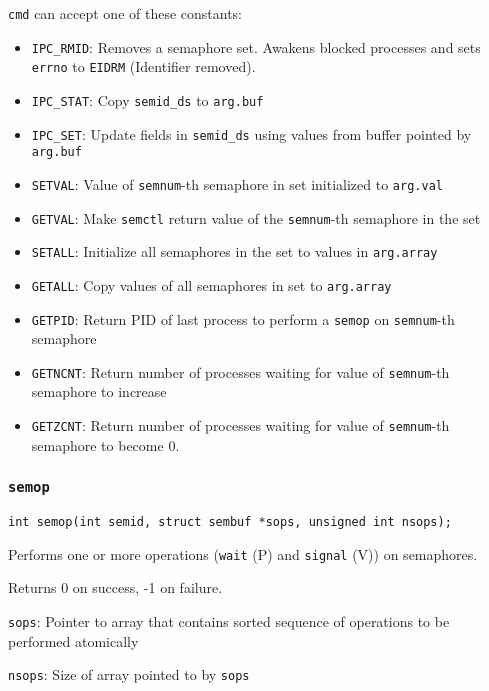 \documentclass{article}
\begin{document}
\texttt{cmd} can accept one of these constants:

\begin{itemize}
    \item \texttt{IPC\_RMID}: Removes a semaphore set. Awakens blocked processes and sets \texttt{errno} to \texttt{EIDRM} (Identifier removed).
    \item \texttt{IPC\_STAT}: Copy \texttt{semid\_ds} to \texttt{arg.buf}
    \item \texttt{IPC\_SET}: Update fields in \texttt{semid\_ds} using values from buffer pointed by \texttt{arg.buf}
    \item \texttt{SETVAL}: Value of \texttt{semnum}-th semaphore in set initialized to \texttt{arg.val}
    \item \texttt{GETVAL}: Make \texttt{semctl} return value of the \texttt{semnum}-th semaphore in the set
    \item \texttt{SETALL}: Initialize all semaphores in the set to values in \texttt{arg.array}
    \item \texttt{GETALL}: Copy values of all semaphores in set to \texttt{arg.array}
    \item \texttt{GETPID}: Return PID of last process to perform a \texttt{semop} on \texttt{semnum}-th semaphore
    \item \texttt{GETNCNT}: Return number of processes waiting for value of \texttt{semnum}-th semaphore to increase
    \item \texttt{GETZCNT}: Return number of processes waiting for value of \texttt{semnum}-th semaphore to become 0.
\end{itemize}


\subsubsection{\texttt{semop}}

\begin{verbatim}
int semop(int semid, struct sembuf *sops, unsigned int nsops);
\end{verbatim}

Performs one or more operations (\texttt{wait} (P) and \texttt{signal} (V)) on semaphores.

Returns 0 on success, -1 on failure.

\texttt{sops}: Pointer to array that contains sorted sequence of operations to be performed atomically

\texttt{nsops}: Size of array pointed to by \texttt{sops}
\end{document}
